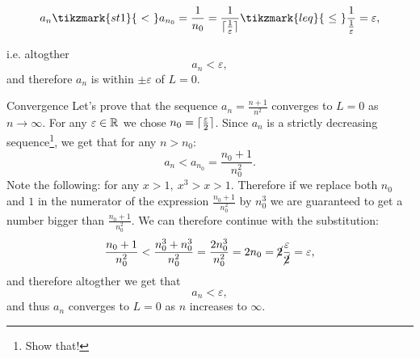 \vspace{2em}
\begin{equation}
	a_{n} \tikzmark{st1}{\ <\ } a_{n_{0}} = \frac{1}{n_{0}} = \frac{1}{\ceil{\frac{1}{\varepsilon}}} \tikzmark{leq}{\ \leq\ } \frac{1}{\frac{1}{\varepsilon}} = \varepsilon,
\end{equation}

\vspace{2em}
i.e. altogther
\begin{equation}
	a_{n} < \varepsilon,
\end{equation}
and therefore $a_{n}$ is within $\pm\varepsilon$ of $L=0$.

\begin{example}{Convergence}{}
	Let's prove that the sequence $a_{n}=\frac{n+1}{n^{2}}$ converges to $L=0$ as $n\to\infty$. For any $\varepsilon\in\mathbb{R}^{}$ we chose $n_{0}=\lceil \frac{\varepsilon}{2} \rceil$. Since $a_{n}$ is a strictly decreasing sequence\footnote{Show that!}, we get that for any $n>n_{0}$:
	\[
		a_{n} < a_{n_{0}} = \frac{n_{0}+1}{n_{0}^{2}}.
	\]
	Note the following: for any $x>1,\ x^{3}>x>1$. Therefore if we replace both $n_{0}$ and $1$ in the numerator of the expression $\frac{n_{0}+1}{n_{0}^{2}}$ by $n_{0}^{3}$ we are guaranteed to get a number bigger than $\frac{n_{0}+1}{n_{0}^{2}}$. We can therefore continue with the substitution:
	\[
		\frac{n_{0}+1}{n_{0}^{2}} < \frac{n_{0}^{3}+n_{0}^{3}}{n_{0}^{2}} = \frac{2n_{0}^{3}}{n_{0}^{2}} = 2n_{0} = \cancel{2}\frac{\varepsilon}{\cancel{2}} = \varepsilon,
	\]
	and therefore altogther we get that
	\[
		a_{n} < \varepsilon,
	\]
	and thus $a_{n}$ converges to $L=0$ as $n$ increases to $\infty$.
\end{example}
